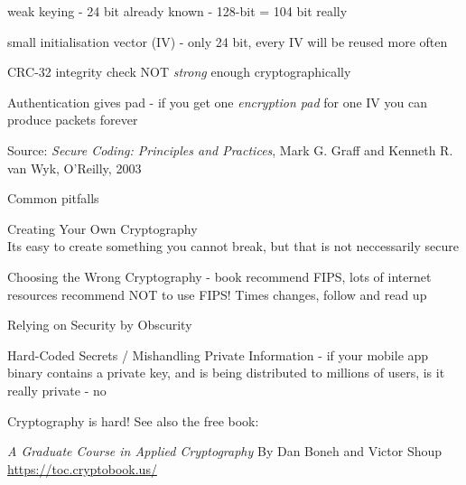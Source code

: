 \documentclass[Screen16to9,17pt]{foils}
\begin{document}






\begin{list1}
\item weak keying - 24 bit already known - 128-bit = 104 bit really
\item small initialisation vector (IV) - only 24 bit, every IV will be reused more often
\item CRC-32 integrity check NOT \emph{strong} enough cryptographically
\item Authentication gives pad - if you get one \emph{encryption pad} for one IV you can produce packets forever
\end{list1}
Source:
\emph{Secure Coding: Principles and Practices}, Mark G. Graff
and Kenneth R. van Wyk, O'Reilly, 2003



Common pitfalls
\begin{list2}
\item Creating Your Own Cryptography\\
Its easy to create something you cannot break, but that is not neccessarily secure
\item Choosing the Wrong Cryptography - book recommend FIPS, lots of internet resources recommend NOT to use FIPS! Times changes, follow and read up
\item Relying on Security by Obscurity
\item Hard-Coded Secrets / Mishandling Private Information - if your mobile app binary contains a private key, and is being distributed to millions of users, is it really private - no
\end{list2}

Cryptography is hard! See also the free book:
\begin{list1}
\item \emph{A Graduate Course in Applied Cryptography} By Dan Boneh and Victor Shoup\\
 \url{https://toc.cryptobook.us/}
\end{list1}

\end{document}
